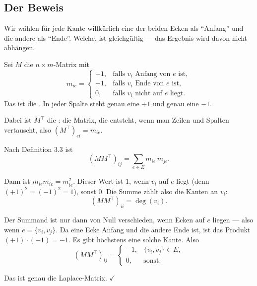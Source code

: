\subsection*{Der Beweis}

\begin{merksatz}
Wir wählen für jede Kante willkürlich eine der beiden Ecken als \enquote{Anfang} und die andere als \enquote{Ende}. Welche, ist gleichgültig --- das Ergebnis wird davon nicht abhängen.

Sei $M$ die $n \times m$-Matrix mit
\[ m_{ie} = \begin{cases}
+1, & \text{falls } v_i \text{ Anfang von } e \text{ ist},\\
-1, & \text{falls } v_i \text{ Ende von } e \text{ ist},\\
0, & \text{falls } v_i \text{ nicht auf } e \text{ liegt.}
\end{cases} \]
Das ist die . In jeder Spalte steht genau eine $+1$ und genau eine $-1$.
\end{merksatz}

\begin{merksatz}
Dabei ist $M^{\!\top}$ die : die Matrix, die entsteht, wenn man Zeilen und Spalten vertauscht, also $(M^{\!\top})_{ei} = m_{ie}$.

Nach Definition 3.3 ist
\[ (M M^{\!\top})_{ij} = \sum_{e \in E} m_{ie}\, m_{je} . \]

 Dann ist $m_{ie}m_{ie} = m_{ie}^2$. Dieser Wert ist $1$, wenn $v_i$ auf $e$ liegt (denn $(+1)^2 = (-1)^2 = 1$), sonst $0$. Die Summe zählt also die Kanten an $v_i$:
\[ (MM^{\!\top})_{ii} = \deg(v_i) . \]

 Der Summand ist nur dann von Null verschieden, wenn  Ecken auf $e$ liegen --- also wenn $e = \{v_i, v_j\}$. Da eine Ecke Anfang und die andere Ende ist, ist das Produkt $(+1)\cdot(-1) = -1$. Es gibt höchstens eine solche Kante. Also
\[ (MM^{\!\top})_{ij} = \begin{cases} -1, & \{v_i,v_j\} \in E,\\ 0, & \text{sonst.}\end{cases} \]

Das ist genau die Laplace-Matrix. $\checkmark$

\begin{center}
\begin{minipage}{0.88\textwidth}
\end{minipage}
\end{center}
\end{merksatz}

